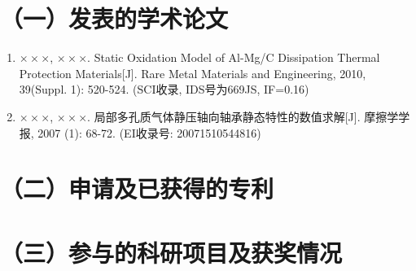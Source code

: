 \publication

\section*{（一）发表的学术论文}
\begin{enumerate}
  \item {\Large$\times \times \times$, $\times \times \times$}. 
    Static Oxidation Model of Al-Mg/C Dissipation Thermal Protection 
    Materials[J]. Rare Metal Materials and Engineering,
    2010, 39(Suppl. 1): 520-524. (SCI收录, IDS号为669JS, IF=0.16)
  \item {\Large$\times \times \times$, $\times \times \times$}. 
    局部多孔质气体静压轴向轴承静态特性的数值求解[J].
    摩擦学学报, 2007 (1): 68-72. (EI收录号: 20071510544816)
\end{enumerate}

\section*{（二）申请及已获得的专利}

\section*{（三）参与的科研项目及获奖情况}


